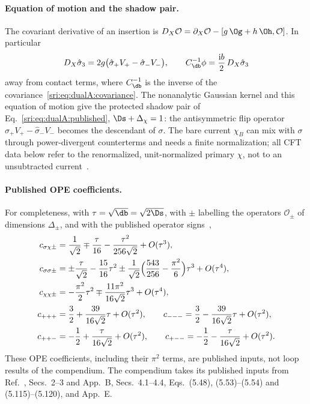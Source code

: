 \paragraph{Equation of motion and the shadow pair.} The covariant derivative of an insertion is
$D_X\mathcal O=\partial_X\mathcal O-[g\,\Og+h\,\Oh,\mathcal O]$. In particular
\begin{equation}
 D_X\hat\sigma_3=2g\bigl(\hat\sigma_+V_+-\hat\sigma_-V_-\bigr),\qquad
 C_{\db}^{-1}\phi=\frac{\mathrm ib}{2}\,D_X\hat\sigma_3
 \label{sri:eq:dualA:eom}
\end{equation}
away from contact terms, where $C_{\db}^{-1}$ is the inverse of the covariance~\eqref{sri:eq:dualA:covariance}. The
nonanalytic Gaussian kernel and this equation of motion give the protected shadow pair of
Eq.~\eqref{sri:eq:dualA:published}, $\Ds+\Delta_\chi=1$: the antisymmetric flip operator
$\hat\sigma_+V_+-\hat\sigma_-V_-$ becomes the descendant of $\sigma$. The bare current $\chi_B$ can mix with $\sigma$
through power-divergent counterterms and needs a finite normalization; all CFT data below refer to the renormalized,
unit-normalized primary $\chi$, not to an unsubtracted current~\cite{sri:Benedetti:2025nzp}.

\paragraph{Published OPE coefficients.} For completeness, with $\tau=\sqrt{\db}=\sqrt{2\Ds}$, with $\pm$ labelling the
operators $\mathcal O_\pm$ of dimensions $\Delta_\pm$, and with the published operator
signs~\cite[eqs.~(5.115) and (5.120)]{sri:Benedetti:2025nzp},
\begin{equation}
\begin{aligned}
 c_{\sigma\chi\pm}&=\frac1{\sqrt2}\mp\frac{\tau}{16}-\frac{\tau^2}{256\sqrt2}+O(\tau^3),\\
 c_{\sigma\sigma\pm}&=\pm\frac{\tau}{\sqrt2}-\frac{15}{16}\tau^2
 \pm\frac1{\sqrt2}\Bigl(\frac{543}{256}-\frac{\pi^2}{6}\Bigr)\tau^3+O(\tau^4),\\
 c_{\chi\chi\pm}&=-\frac{\pi^2}{2}\tau^2\mp\frac{11\pi^2}{16\sqrt2}\tau^3+O(\tau^4),\\
 c_{+++}&=\frac32+\frac{39}{16\sqrt2}\tau+O(\tau^2),\qquad
 c_{---}=\frac32-\frac{39}{16\sqrt2}\tau+O(\tau^2),\\
 c_{++-}&=-\frac12+\frac{\tau}{16\sqrt2}+O(\tau^2),\qquad
 c_{+--}=-\frac12-\frac{\tau}{16\sqrt2}+O(\tau^2).
\end{aligned}
\label{sri:eq:dualA:ope}
\end{equation}
These OPE coefficients, including their $\pi^2$ terms, are published inputs, not loop results of the compendium.
The compendium takes its published inputs from Ref.~\cite{sri:Benedetti:2025nzp}, Secs.~2--3 and App.~B, Secs.~4.1--4.4,
Eqs.~(5.48), (5.53)--(5.54) and (5.115)--(5.120), and App.~E.

